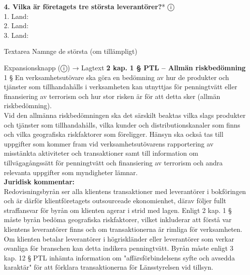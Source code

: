 \documentclass[10pt]{beamer}
\begin{document}
\begin{frame}[label=riskfragor-steg2]
  \vspace{0.2cm}

  \textbf{4. Vilka är företagets tre största leverantörer?}* \hspace{0.3cm} ⓘ\\
  \tiny 1. \underline{\hspace{5cm}} Land: \underline{\hspace{2cm}}\\
  \tiny 2. \underline{\hspace{5cm}} Land: \underline{\hspace{2cm}}\\
  \tiny 3. \underline{\hspace{5cm}} Land: \underline{\hspace{2cm}}
  \begin{block}{Textarea}
    \tiny Namnge de största (om tillämpligt)
  \end{block}
  \begin{alertblock}{Expansionsknapp (ⓘ) → Lagtext}
    \tiny \textbf{2 kap. 1 § PTL – Allmän riskbedömning}\\
    \tiny 1 §   En verksamhetsutövare ska göra en bedömning av hur de produkter och tjänster
     som tillhandahålls i verksamheten kan utnyttjas för penningtvätt eller finansiering 
     av terrorism och hur stor risken är för att detta sker (allmän riskbedömning).\\

    \tiny Vid den allmänna riskbedömningen ska det särskilt beaktas vilka slags produkter och
     tjänster som tillhandahålls, vilka kunder och distributionskanaler som finns
     och vilka geografiska riskfaktorer som föreligger. Hänsyn ska också tas till 
     uppgifter som kommer fram vid verksamhetsutövarens rapportering av misstänkta 
     aktiviteter och transaktioner samt till information om tillvägagångssätt för 
     penningtvätt och finansiering av terrorism och andra relevanta uppgifter som 
     myndigheter lämnar.\\[0.1cm]

    \tiny \textbf{Juridisk kommentar:}\\
    \tiny Redovisningsbyrån ser alla klientens transaktioner med leverantörer i bokföringen
    och är därför klientföretagets outsourceade ekonomienhet, därav följer fullt straffansvar för byrån
    om klienten agerar i strid med lagen. Enligt 2 kap. 1 § måste byrån bedöma geografiska riskfaktorer, vilket inkluderar att
    förstå var klientens leverantörer finns och om transaktionerna är rimliga för verksamheten.
    Om klienten betalar leverantörer i högriskländer eller leverantörer som verkar ovanliga
    för branschen kan detta indikera penningtvätt. Byrån måste enligt 3 kap. 12 § PTL inhämta
    information om "affärsförbindelsens syfte och avsedda karaktär" för att förklara
    transaktionerna för Länsstyrelsen vid tillsyn.\\[0.1cm]
    

\end{alertblock}
\end{frame}
\end{document}
